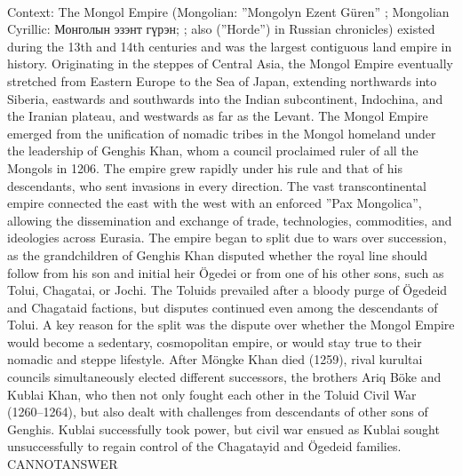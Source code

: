 \documentclass[11pt,a4paper, onecolumn]{article}
\begin{document}
\\ Context: The Mongol Empire (Mongolian: ''Mongolyn Ezent Güren'' ; Mongolian Cyrillic: Монголын эзэнт гүрэн; ; also (''Horde'') in Russian chronicles) existed during the 13th and 14th centuries and was the largest contiguous land empire in history. Originating in the steppes of Central Asia, the Mongol Empire eventually stretched from Eastern Europe to the Sea of Japan, extending northwards into Siberia, eastwards and southwards into the Indian subcontinent, Indochina, and the Iranian plateau, and westwards as far as the Levant. The Mongol Empire emerged from the unification of nomadic tribes in the Mongol homeland under the leadership of Genghis Khan, whom a council proclaimed ruler of all the Mongols in 1206. The empire grew rapidly under his rule and that of his descendants, who sent invasions in every direction. The vast transcontinental empire connected the east with the west with an enforced ''Pax Mongolica'', allowing the dissemination and exchange of trade, technologies, commodities, and ideologies across Eurasia. The empire began to split due to wars over succession, as the grandchildren of Genghis Khan disputed whether the royal line should follow from his son and initial heir Ögedei or from one of his other sons, such as Tolui, Chagatai, or Jochi. The Toluids prevailed after a bloody purge of Ögedeid and Chagataid factions, but disputes continued even among the descendants of Tolui. A key reason for the split was the dispute over whether the Mongol Empire would become a sedentary, cosmopolitan empire, or would stay true to their nomadic and steppe lifestyle. After Möngke Khan died (1259), rival kurultai councils simultaneously elected different successors, the brothers Ariq Böke and Kublai Khan, who then not only fought each other in the Toluid Civil War (1260–1264), but also dealt with challenges from descendants of other sons of Genghis. Kublai successfully took power, but civil war ensued as Kublai sought unsuccessfully to regain control of the Chagatayid and Ögedeid families. CANNOTANSWER
\end{document}

